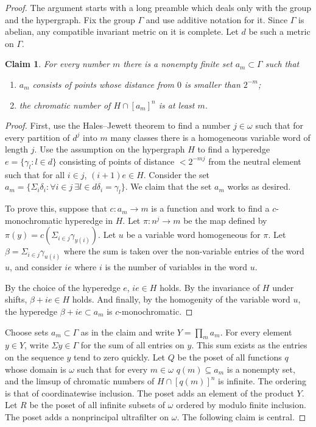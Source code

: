 \documentclass{article}
\newcommand{\gb}{\beta}
\newcommand{\gw}{\omega}
\newcommand{\gS}{\Sigma}
\newtheorem{claim}[theorem]{Claim}
\theoremstyle{definition}
\begin{document}
\begin{proof}
The argument starts with a long preamble which deals only with the group and the hypergraph. Fix the group $\Gamma$ and use additive notation for it. Since $\Gamma$ is abelian, any compatible invariant metric on it is complete. Let $d$ be such a metric on $\Gamma$. 
	
	\begin{claim}
		For every number $m$ there is a nonempty finite set $a_m\subset\Gamma$ such that
		
		\begin{enumerate}
			\item $a_m$ consists of points whose distance from $0$ is smaller than $2^{-m}$;
			\item the chromatic number of $H\cap [a_m]^n$ is at least $m$.
		\end{enumerate}
	\end{claim}
	
	\begin{proof}
		First, use the Hales--Jewett theorem \cite{hales:hales} to find a number $j\in\gw$ such that for every partition of $d^j$ into $m$ many classes there is a homogeneous variable word of length $j$. Use the assumption on the hypergraph $H$ to find a hyperedge $e=\{\gamma_l\colon l\in d\}$ consisting of points of distance $<2^{-mj}$ from the neutral element such that for all $i\in j$, $(i+1)e\in H$. Consider the set $a_m=\{\gS_i\delta_i\colon \forall i\in j\ \exists l\in d\delta_i=\gamma_l\}$. We claim that the set $a_m$ works as desired.
		
		To prove this, suppose that $c\colon a_m\to m$ is a function and work to find a $c$-monochromatic hyperedge in $H$. Let $\pi\colon n^j\to m$ be the map defined by $\pi(y)=c(\gS_{i\in j}\gamma_{y(i)})$. Let $u$ be a variable word homogeneous for $\pi$. Let $\gb=\gS_{i\in j}\gamma_{u(i)}$ where the sum is taken over the non-variable entries of the word $u$, and consider $ie$ where $i$ is the number of variables in the word $u$. 
		
		By the choice of the hyperedge $e$, $ie\in H$ holds. By the invariance of $H$ under shifts, $\gb+ie\in H$ holds. And finally, by the homogenity of the variable word $u$, the hyperedge $\gb+ie\subset a_m$ is $c$-monochromatic.
	\end{proof}

\noindent Choose sets $a_m\subset\Gamma$ as in the claim and write $Y=\prod_ma_m$. For every element $y\in Y$, write $\gS y\in \Gamma$ for the sum of all entries on $y$. This sum exists as the entries on the sequence $y$ tend to zero quickly. Let $Q$ be the poset of all functions $q$ whose domain is $\gw$ such that for every $m\in\gw$ $q(m)\subseteq a_m$ is a nonempty set, and the limsup of chromatic numbers of $H\cap [q(m)]^n$ is infinite. The ordering is that of coordinatewise inclusion. The poset adds an element of the product $Y$. Let $R$ be the poset of all infinite subsets of $\gw$ ordered by modulo finite inclusion. The poset adds a nonprincipal ultrafilter on $\gw$. The following claim is central.
		

\end{proof}
\end{document}
